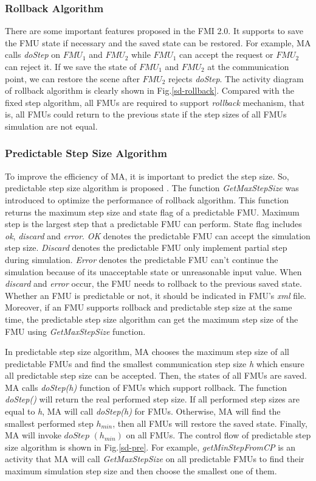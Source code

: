 \subsubsection{Rollback Algorithm}
There are some important features proposed in the FMI 2.0. It supports to save the FMU state if necessary and the saved state can be restored. For example, MA calls \emph{doStep} on $FMU_{1}$ and $FMU_{2}$ while $FMU_{1}$ can accept the request or $FMU_{2}$ can reject it. If we save the state of $FMU_{1}$ and $FMU_{2}$ at the communication point, we can restore the scene after $FMU_{2}$ rejects \emph{doStep}. The activity diagram of rollback algorithm \cite{BromanBGLMTW13} is clearly shown in Fig.\ref{sd-rollback}. Compared with the fixed step algorithm, all FMUs are required to support \emph{rollback} mechanism, that is, all FMUs could return to the previous state if the step sizes of all FMUs simulation are not equal.
\subsubsection{Predictable Step Size Algorithm}
To improve the efficiency of MA, it is important to predict the step size. So, predictable step size algorithm is proposed \cite{BromanBGLMTW13}. The function \emph{GetMaxStepSize} was introduced to optimize the performance of rollback algorithm. This function returns the maximum step size and state flag of a predictable FMU. Maximum step is the largest step that a predictable FMU can perform. State flag includes \emph{ok}, \emph{discard} and \emph{error}. \emph{OK} denotes the predictable FMU can accept the simulation step size. \emph{Discard} denotes the predictable FMU only implement partial step during simulation. \emph{Error} denotes the predictable FMU can't continue the simulation because of its unacceptable state or unreasonable input value. When \emph{discard} and \emph{error} occur, the FMU needs to rollback to the previous saved state. Whether an FMU is predictable or not, it should be indicated in FMU's \emph{xml} file. Moreover, if an FMU supports rollback and predictable step size at the same time, the predictable step size algorithm can get the maximum step size of the FMU using \emph{GetMaxStepSize} function.

In predictable step size algorithm, MA chooses the maximum step size of all predictable FMUs and find the smallest communication step size \emph{h} which ensure all predictable step size can be accepted. Then, the states of all FMUs are saved. MA calls \emph{doStep(h)} function of FMUs which support rollback. The function \emph{doStep()} will return the real performed step size. If all performed step sizes are equal to \emph{h}, MA will call \emph{doStep(h)} for FMUs. Otherwise, MA will find the smallest performed step $h_{min}$, then all FMUs will restore the saved state. Finally, MA will invoke $doStep$ $(h_{min})$ on all FMUs. The control flow of predictable step size algorithm is shown in Fig.\ref{sd-pre}. For example, \emph{getMinStepFromCP} is an activity that MA will call \emph{GetMaxStepSize} on all predictable FMUs to find their maximum simulation step size and then choose the smallest one of them. 

